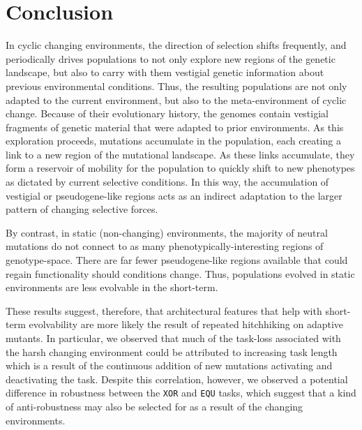 \documentclass[10pt,letterpaper]{article}
\begin{document}
\section*{Conclusion}

In cyclic changing environments, the direction of selection shifts frequently, and periodically drives populations to not only explore new regions of the genetic landscape, but also to carry with them vestigial genetic information about previous environmental conditions. Thus, the resulting populations are not only adapted to the current environment, but also to the meta-environment of cyclic change. Because of their evolutionary history, the genomes contain vestigial fragments of genetic material that were adapted to prior environments. As this exploration proceeds, mutations accumulate in the population, each creating a link to a new region of the mutational landscape. As these links accumulate, they form a reservoir of mobility for the population to quickly shift to new phenotypes as dictated by current selective conditions. In this way, the accumulation of vestigial or pseudogene-like regions acts as an indirect adaptation to the larger pattern of changing selective forces. 

By contrast, in static (non-changing) environments, the majority of neutral mutations do not connect to as many phenotypically-interesting regions of genotype-space. There are far fewer pseudogene-like regions available that could regain functionality should conditions change. Thus, populations evolved in static environments are less evolvable in the short-term.

These results suggest, therefore, that architectural features that help with short-term evolvability are more likely the result of repeated hitchhiking on adaptive mutants. In particular, we observed that much of the task-loss associated with the harsh changing environment could be attributed to increasing task length which is a result of the continuous addition of new mutations activating and deactivating the task. Despite this correlation, however, we observed a potential difference in robustness between the \texttt{XOR} and \texttt{EQU} tasks, which suggest that a kind of anti-robustness may also be selected for as a result of the changing environments.
\end{document}
